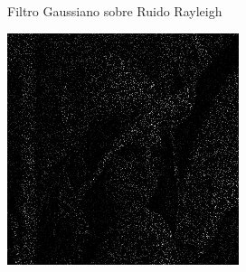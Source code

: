 \documentclass{beamer}
\begin{document}
\begin{frame}[fragile]{Filtro Gaussiano sobre Ruido Rayleigh}
\begin{minipage}{0.25\linewidth}
	\end{minipage}\hfill
	\begin{minipage}{0.25\linewidth}
		\centering
		\includegraphics[width=\linewidth]{../results/lena_rayleigh_xi10}
	\end{minipage}
	

\end{frame}
\end{document}
